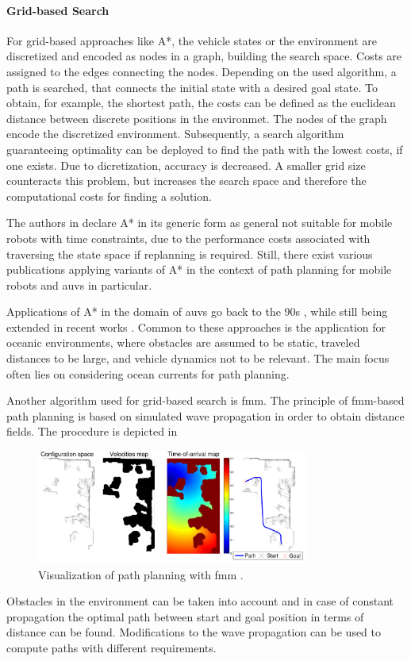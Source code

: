 \paragraph{Grid-based Search}
For grid-based approaches like A*, the vehicle states or the environment are discretized and encoded as nodes in a graph, building the search space. Costs are assigned to the edges connecting the nodes. Depending on the used algorithm, a path is searched, that connects the initial state with a desired goal state.
To obtain, for example, the shortest path, the costs can be defined as the euclidean distance between discrete positions in the environmet. The  nodes of the graph encode the discretized environment.
Subsequently, a search algorithm guaranteeing optimality can be deployed to find the path with the lowest costs, if one exists. Due to dicretization, accuracy is decreased. A smaller grid size counteracts this problem, but increases the search space and therefore the computational costs for finding a solution.

The authors in \cite{Fernandes2015TowardsAO} declare A* in its generic form as general not suitable for mobile robots with time constraints, due to the performance costs associated with traversing the state space if replanning is required. Still, there exist various publications applying variants of A* in the context of path planning for mobile robots and \acp{auv} in particular.

Applications of A* in the domain of \acp{auv} go back to the 90s \cite{Carroll92}, while still being extended in recent works \cite{zhang20}. Common to these approaches is the application for oceanic environments, where obstacles are assumed to be static, traveled distances to be large, and vehicle dynamics not to be relevant. The main focus often lies on considering ocean currents for path planning.

Another algorithm used for grid-based search is \ac{fmm}. The principle of \acs{fmm}-based path planning is based on simulated wave propagation in order to obtain distance fields. The procedure is depicted in 
\begin{figure}
    \centering
    \includegraphics[width=0.8\textwidth]{images/02/fmm.png}
    \caption{Visualization of path planning with \ac{fmm} \cite{Gomez15}.}
    \label{fig:fmm}
\end{figure}
Obstacles in the environment can be taken into account and in case of constant propagation the optimal path between start and goal position in terms of distance can be found. Modifications to the wave propagation can be used to compute paths with different requirements.


